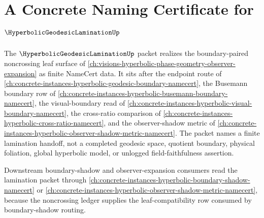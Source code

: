 \chapter{A Concrete Naming Certificate for $\HyperbolicGeodesicLaminationUp$}
\label{ch:concrete-instances-hyperbolic-geodesic-lamination-namecert}

The $\HyperbolicGeodesicLaminationUp$ packet realizes the boundary-paired noncrossing leaf surface of \autoref{ch:visions-hyperbolic-phase-geometry-observer-expansion} as finite NameCert data. It sits after the endpoint route of \autoref{ch:concrete-instances-hyperbolic-geodesic-boundary-namecert}, the Busemann boundary row of \autoref{ch:concrete-instances-hyperbolic-busemann-boundary-namecert}, the visual-boundary read of \autoref{ch:concrete-instances-hyperbolic-visual-boundary-namecert}, the cross-ratio comparison of \autoref{ch:concrete-instances-hyperbolic-cross-ratio-namecert}, and the observer-shadow metric of \autoref{ch:concrete-instances-hyperbolic-observer-shadow-metric-namecert}. The packet names a finite lamination handoff, not a completed geodesic space, quotient boundary, physical foliation, global hyperbolic model, or unlogged field-faithfulness assertion.

Downstream boundary-shadow and observer-expansion consumers read the lamination packet through \autoref{ch:concrete-instances-hyperbolic-boundary-shadow-namecert} or \autoref{ch:concrete-instances-hyperbolic-observer-shadow-metric-namecert}, because the noncrossing ledger supplies the leaf-compatibility row consumed by boundary-shadow routing.

